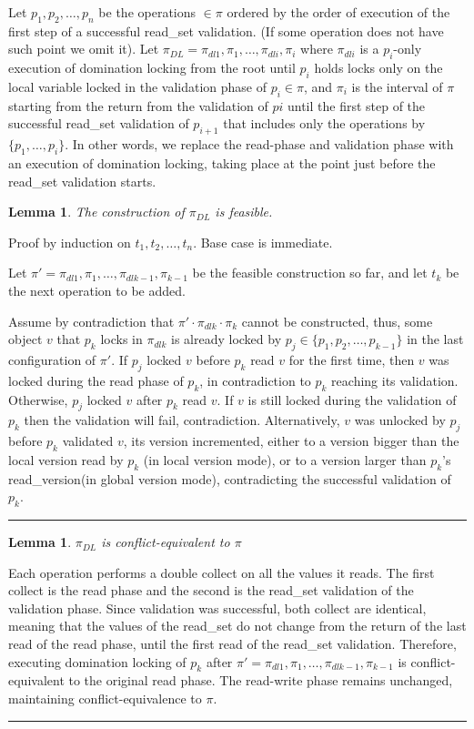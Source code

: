 \documentclass{article}
\newtheorem{lemma}[theorem]{Lemma}
\newenvironment{proof}[1][Proof]{\begin{trivlist}
\item[\hskip \labelsep {\bfseries #1}]}{\qedsymb\end{trivlist}}
\newcommand{\qedsymb}{\hfill{\rule{2mm}{2mm}}}
\newcommand{\code}[1]{\textsf{#1}}
\newcommand{\readV}{\code{read\_version}\xspace}
\newcommand{\readSet}{\code{read\_set}\xspace}
\begin{document}
Let $p_1,p_2,\ldots,p_n$ be the operations $\in\pi$ ordered by the 
order of execution of the first step of a successful \readSet 
validation. (If some operation does not have such point we omit it).
Let $\pi_{DL} = \pi_{dl1},\pi_{1},\ldots,\pi_{dli},\pi_{i}$ where 
$\pi_{dli}$ is a $p_i$-only execution of domination locking from 
the root until $p_i$ holds locks only on the local variable locked
in the validation phase of $p_i \in \pi$, and $\pi_i$ is
the interval of $\pi$ starting from the return from the validation of
$pi$ until the first step of the successful \readSet validation of 
$p_{i+1}$ that includes only the operations by $\{p_1,\ldots,p_i\}$.
In other words, we replace the read-phase and validation phase with 
an execution of domination locking, taking place at the point just 
before the \readSet validation starts. 

\begin{lemma}
The construction of $\pi_{DL}$ is feasible.  
\end{lemma}
\begin{proof}
Proof by induction on $t_1,t_2,\ldots,t_n$. Base case is immediate. 

Let $\pi' = \pi_{dl1},\pi_{1},\ldots,\pi_{dlk-1},\pi_{k-1}$ be the feasible
construction so far, and let $t_{k}$ be the next operation to be 
added. 

Assume by contradiction that $\pi'\cdot\pi_{dlk}\cdot\pi_{k}$ 
cannot be constructed, thus, some object $v$ that $p_{k}$ locks 
in $\pi_{dlk}$ is already locked 
by $p_j \in \{p_1,p_2,\ldots,p_{k-1}\}$ in
the last configuration of $\pi'$. 
If $p_j$ locked $v$ before $p_k$ read $v$ for the first time, 
then $v$ was locked during the read phase of $p_k$, 
in contradiction to $p_k$ reaching its validation. 
Otherwise, $p_j$ locked $v$ after $p_k$ read $v$. 
If $v$ is still locked during the validation of $p_k$ then 
the validation will fail, contradiction. Alternatively, $v$ 
was unlocked by $p_j$ before $p_k$ validated $v$, 
its version incremented, either to a version bigger than the local version
read by $p_k$ (in local version mode), or to a version larger than 
$p_k$'s \readV (in global version mode), contradicting the 
successful validation of $p_k$.  
\end{proof}

\begin{lemma}
$\pi_{DL}$ is conflict-equivalent to $\pi$
\end{lemma}
\begin{proof}
Each operation performs a double collect on all the values it reads. 
The first collect is the read phase and the second is the \readSet 
validation of the validation phase. Since validation was successful, 
both collect are identical, meaning that the values of the \readSet
do not change from the return of the last read of the read phase,
until the first read of the \readSet validation. Therefore, executing 
domination locking of $p_k$ after $\pi' =
\pi_{dl1},\pi_{1},\ldots,\pi_{dlk-1},\pi_{k-1}$ is conflict-equivalent
to the original read phase. The read-write phase remains unchanged, 
maintaining conflict-equivalence to $\pi$.
\end{proof}
\end{document}
